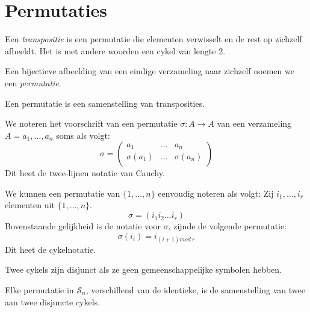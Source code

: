\documentclass[main.tex]{subfiles}
\begin{document}
\section{Permutaties}
\label{sec:permutaties}

\begin{de}
  Een \emph{transpositie} is een permutatie die elementen verwisselt en de rest op zichzelf afbeeldt.
  Het is met andere woorden een cykel van lengte 2.
\end{de}

\begin{de}
  Een bijectieve afbeelding van een eindige verzameling naar zichzelf noemen we een \emph{permutatie}.
\end{de}

\begin{st}
  Een permutatie is een samenstelling van transposities.

\end{st}

\begin{de}
  We noteren het voorschrift van een permutatie $\sigma: A\rightarrow A$ van een verzameling $A = a_{1},\dotsc,a_{n}$ soms als volgt:
  \[
  \sigma = 
  \begin{pmatrix}
    a_{1}         & \hdots & a_{n}         \\
    \sigma(a_{1}) & \hdots & \sigma(a_{n}) \\
  \end{pmatrix}
  \]
  Dit heet de twee-lijnen notatie van Cauchy.
\end{de}

\begin{de}
  We kunnen een permutatie van $\{1,\dotsc,n\}$ eenvoudig noteren als volgt:
  Zij $i_{1},\dotsc,i_{r}$ elementen uit $\{1,\dotsc,n\}$.
  \[ \sigma = (i_{1}i_{2}\dotsc i_{r}) \]
  Bovenstaande gelijkheid is de notatie voor $\sigma$, zijnde de volgende permutatie:
  \[ \sigma(i_{i}) = i_{(i+1) mod\ r} \]
  Dit heet de cykelnotatie.
\end{de}

\begin{de}
  Twee cykels zijn disjunct als ze geen gemeenschappelijke symbolen hebben. 
\end{de}

\begin{st}
  Elke permutatie in $\mathcal{S}_{n}$, verschillend van de identieke, is de samenstelling van twee aan twee disjuncte cykels.

\end{st}
\end{document}
